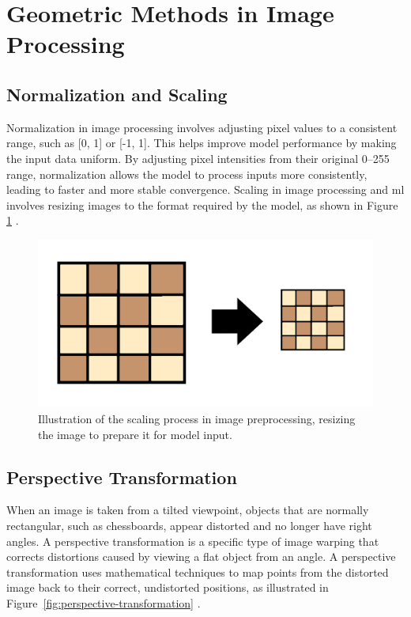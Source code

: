 \newpage

\section{Geometric Methods in Image Processing}
\label{sec:geometric-methods}

\subsection{Normalization and Scaling}
\label{subsec:normalization-and-scaling}

Normalization in image processing involves adjusting pixel values to a consistent range, such as [0, 1] or [-1, 1]. This helps improve model performance by making the input data uniform. By adjusting pixel intensities from their original 0–255 range, normalization allows the model to process inputs more consistently, leading to faster and more stable convergence.
Scaling in image processing and \gls{ml} involves resizing images to the format required by the model, as shown in Figure \ref{fig:scaling} \cite{brownlee:normalization}. 

\begin{figure}[h!]
    \centering
    \includegraphics[width=0.75\linewidth]{figures/theory/image-recognition/scaling.png}
    \caption[Scaling before and after]{Illustration of the scaling process in image preprocessing, resizing the image to prepare it for model input.}
    \label{fig:scaling}
\end{figure}

\subsection{Perspective Transformation}
\label{subsec:perspective-transformation}

When an image is taken from a tilted viewpoint, objects that are normally rectangular, such as chessboards, appear distorted and no longer have right angles. A perspective transformation is a specific type of image warping that corrects distortions caused by viewing a flat object from an angle. A perspective transformation uses mathematical techniques to map points from the distorted image back to their correct, undistorted positions, as illustrated in Figure~\ref{fig:perspective-transformation} \cite{nvidia:perspective-transform}.

